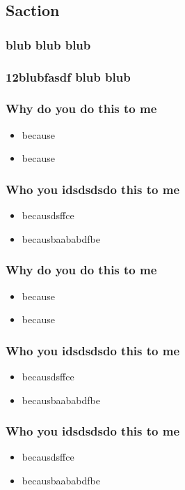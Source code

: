 \documentclass{beamer}
\begin{document}
        \subsection{Saction}
            \begin{frame}
                \frametitle{blub blub blub}
            \end{frame}
            \begin{frame}
                \frametitle{12blubfasdf blub blub}
            \end{frame}
        \begin{frame}
            \frametitle{Why do you do this to me}
            \begin{itemize}
                \item because
                \item because
            \end{itemize}
        \end{frame}
        \begin{frame}
            \frametitle{Who you idsdsdsdo this to me}
            \begin{itemize}
                \item becausdsffce
                \item becausbaababdfbe
            \end{itemize}
        \end{frame}
        \begin{frame}
            \frametitle{Why do you do this to me}
            \begin{itemize}
                \item because
                \item because
            \end{itemize}
        \end{frame}
        \begin{frame}
            \frametitle{Who you idsdsdsdo this to me}
            \begin{itemize}
                \item becausdsffce
                \item becausbaababdfbe
            \end{itemize}
        \end{frame}
        \begin{frame}
            \frametitle{Who you idsdsdsdo this to me}
            \begin{itemize}
                \item becausdsffce
                \item becausbaababdfbe
            \end{itemize}
        \end{frame}
\end{document}
